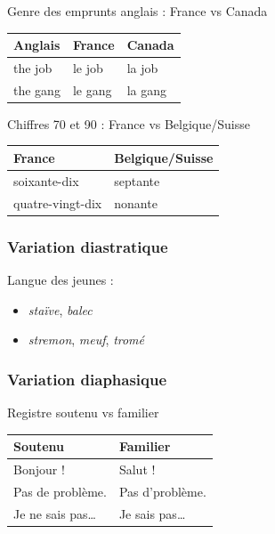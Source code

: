 \documentclass[
  letterpaper,
]{scrbook}
\begin{document}
Genre des emprunts anglais : France vs Canada

\begin{longtable}[]{@{}lll@{}}
\toprule\noalign{}
Anglais & France & Canada \\
\midrule\noalign{}
\endhead
\bottomrule\noalign{}
\endlastfoot
the job & le job & la job \\
the gang & le gang & la gang \\
\end{longtable}

Chiffres 70 et 90 : France vs Belgique/Suisse

\begin{longtable}[]{@{}ll@{}}
\toprule\noalign{}
France & Belgique/Suisse \\
\midrule\noalign{}
\endhead
\bottomrule\noalign{}
\endlastfoot
soixante-dix & septante \\
quatre-vingt-dix & nonante \\
\end{longtable}

\hypertarget{variation-diastratique}{%
\subsubsection{Variation diastratique}\label{variation-diastratique}}

Langue des jeunes :

\begin{itemize}
\item
  \emph{staïve}, \emph{balec}
\item
  \emph{stremon}, \emph{meuf}, \emph{tromé}
\end{itemize}

\hypertarget{variation-diaphasique}{%
\subsubsection{Variation diaphasique}\label{variation-diaphasique}}

Registre soutenu vs familier

\begin{longtable}[]{@{}ll@{}}
\toprule\noalign{}
Soutenu & Familier \\
\midrule\noalign{}
\endhead
\bottomrule\noalign{}
\endlastfoot
Bonjour ! & Salut ! \\
Pas de problème. & Pas d'problème. \\
Je ne sais pas\ldots{} & Je sais pas\ldots{} \\
\end{longtable}
\end{document}

